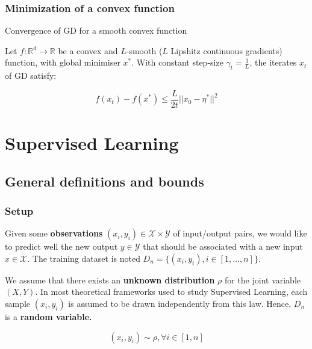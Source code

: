 \documentclass[
10pt, %
a4paper, %
oneside, %
headinclude,footinclude, %
BCOR5mm, %
]{scrartcl}
\begin{document}
\subsubsection{\large\color{Periwinkle}Minimization of a convex function}

\begin{theorem}{Convergence of GD for a smooth convex function}

    Let $f: \mathbb{R}^d\rightarrow \mathbb{R} $ be a convex and $L$-smooth ($L$ Lipshitz continuous gradients) function, with global minimiser $x^*$.
    With constant step-size $\gamma_t = \frac{1}{L} $, the iterates $x_t$ of GD satisfy:

    \begin{equation*}
	f(x_t)-f(x^*)\leq \frac{L}{2t} ||x_0-\eta^*||^2
    \end{equation*}
\end{theorem}


\section{\large\color{Blue}Supervised Learning}

\subsection{\large\color{MidnightBlue}General definitions and bounds}

\subsubsection{\large\color{Periwinkle}Setup}

Given some \textbf{{observations}} $(x_i,y_i)\in \mathcal{X} \times \mathcal{Y}$ of input/output pairs, we would like to predict well the new output $y\in \mathcal{Y} $ that should be associated with a new input $x\in \mathcal{X} $. The training dataset is noted $D_n = \{(x_i, y_i), i\in [1, \dots, n]\}$.

We assume that there exists an \textbf{{unknown distribution}} $\rho$ for the joint variable $(X,Y)$.  In most theoretical frameworks used to study Supervised Learning, each sample $(x_i,y_i)$ is assumed to be drawn independently from this law. Hence, $D_n$ is a \textbf{{random variable.}} 

\begin{equation}
    (x_i,y_i)\sim \rho, \forall i\in[1, n]
\end{equation}
\end{document}
